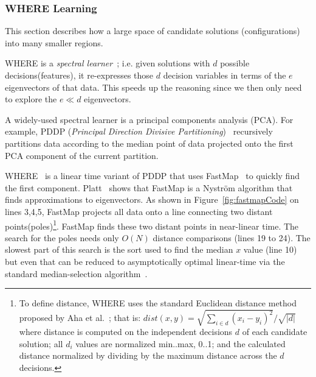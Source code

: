 \documentclass{sig-alternative}
\newcommand{\fig}[1]{Figure~\ref{fig:#1}}
\begin{document}
\subsubsection{WHERE Learning}\label{sec:spectral}
This section describes how a large space of candidate solutions (configurations) into many smaller regions.

WHERE is a {\em spectral learner}~\cite{kamvar2003spectral}; i.e. given solutions with $d$ possible decisions(features), it re-expresses those $d$ decision variables in terms of the $e$ eigenvectors of that data.
This speeds up the reasoning since we then only need to explore the $e\ll d$   eigenvectors.

A widely-used spectral learner is a principal components analysis (PCA). For example, PDDP ({\em Principal Direction Divisive Partitioning})~\cite{boley1998principal} recursively partitions data according to the median point of data projected onto the first PCA component of the current partition.

WHERE~\cite{me12d} is a linear time variant of PDDP  that uses FastMap~\cite{Faloutsos1995} to quickly find the first component.
Platt~\cite{platt05} shows that FastMap is a  Nystr\"om algorithm that finds approximations to eigenvectors.
As shown in \fig{fastmapCode} on lines 3,4,5, FastMap  projects all data onto a line connecting two distant points(poles)\footnote{
To define distance, WHERE uses the standard Euclidean distance method proposed by Aha et al.~\cite{aha91}; that is: $dist(x,y)= \sqrt{\sum_{i\in d} (x_i - y_i)^2}/\sqrt{ \left\vert{d}\right\vert }$ where distance is computed on the independent decisions $d$ of each candidate solution; all $d_i$ values are normalized min..max, 0..1; and the calculated distance normalized by dividing by the maximum distance across the $d$ decisions.}. 
FastMap finds these two distant points in near-linear time. 
The search for the poles needs only $O(N)$ distance comparisons (lines 19 to 24).
The slowest part of this search is the sort used to find the median $x$ value (line 10) but even that can be reduced to  asymptotically optimal linear-time via the standard median-selection algorithm~\cite{hoare61}.
\end{document}
